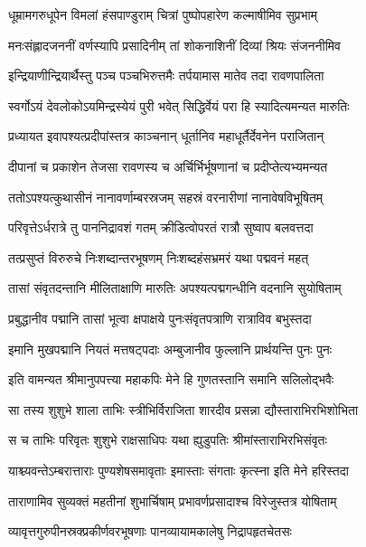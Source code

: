 \twolineshloka
{धूम्रामगरुधूपेन विमलां हंसपाण्डुराम्}
{चित्रां पुष्पोपहारेण कल्माषीमिव सुप्रभाम्} %

\twolineshloka
{मनःसंह्लादजननीं वर्णस्यापि प्रसादिनीम्}
{तां शोकनाशिनीं दिव्यां श्रियः संजननीमिव} %

\twolineshloka
{इन्द्रियाणीन्द्रियार्थैस्तु पञ्च पञ्चभिरुत्तमैः}
{तर्पयामास मातेव तदा रावणपालिता} %

\twolineshloka
{स्वर्गोऽयं देवलोकोऽयमिन्द्रस्येयं पुरी भवेत्}
{सिद्धिर्वेयं परा हि स्यादित्यमन्यत मारुतिः} %

\twolineshloka
{प्रध्यायत इवापश्यत्प्रदीपांस्तत्र काञ्चनान्}
{धूर्तानिव महाधूर्तैर्देवनेन पराजितान्} %

\twolineshloka
{दीपानां च प्रकाशेन तेजसा रावणस्य च}
{अर्चिर्भिर्भूषणानां च प्रदीप्तेत्यभ्यमन्यत} %

\twolineshloka
{ततोऽपश्यत्कुथासीनं नानावर्णाम्बरस्रजम्}
{सहस्रं वरनारीणां नानावेषविभूषितम्} %

\twolineshloka
{परिवृत्तेऽर्धरात्रे तु पाननिद्रावशं गतम्}
{क्रीडित्वोपरतं रात्रौ सुष्वाप बलवत्तदा} %

\twolineshloka
{तत्प्रसुप्तं विरुरुचे निःशब्दान्तरभूषणम्}
{निःशब्दहंसभ्रमरं यथा पद्मवनं महत्} %

\twolineshloka
{तासां संवृतदन्तानि मीलिताक्षाणि मारुतिः}
{अपश्यत्पद्मगन्धीनि वदनानि सुयोषिताम्} %

\twolineshloka
{प्रबुद्धानीव पद्मानि तासां भूत्वा क्षपाक्षये}
{पुनःसंवृतपत्राणि रात्राविव बभुस्तदा} %

\twolineshloka
{इमानि मुखपद्मानि नियतं मत्तषट्पदाः}
{अम्बुजानीव फुल्लानि प्रार्थयन्ति पुनः पुनः} %

\twolineshloka
{इति वामन्यत श्रीमानुपपत्त्या महाकपिः}
{मेने हि गुणतस्तानि समानि सलिलोद्भवैः} %

\twolineshloka
{सा तस्य शुशुभे शाला ताभिः स्त्रीभिर्विराजिता}
{शारदीव प्रसन्ना द्यौस्ताराभिरभिशोभिता} %

\twolineshloka
{स च ताभिः परिवृतः शुशुभे राक्षसाधिपः}
{यथा ह्युडुपतिः श्रीमांस्ताराभिरभिसंवृतः} %

\twolineshloka
{याश्च्यवन्तेऽम्बरात्ताराः पुण्यशेषसमावृताः}
{इमास्ताः संगताः कृत्स्ना इति मेने हरिस्तदा} %

\twolineshloka
{ताराणामिव सुव्यक्तं महतीनां शुभार्चिषाम्}
{प्रभावर्णप्रसादाश्च विरेजुस्तत्र योषिताम्} %

\twolineshloka
{व्यावृत्तगुरुपीनस्रक्प्रकीर्णवरभूषणाः}
{पानव्यायामकालेषु निद्रापहृतचेतसः} %

